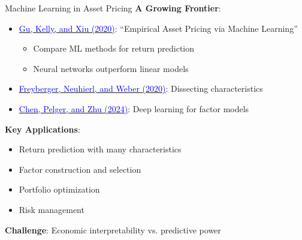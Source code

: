 \documentclass{beamer}
\begin{document}
\begin{frame}{Machine Learning in Asset Pricing}
	\textbf{A Growing Frontier}:
	\begin{itemize}
		\item \href{https://doi.org/10.1093/rfs/hhaa009}{\textcolor{blue}{Gu, Kelly, and Xiu (2020)}}: ``Empirical Asset Pricing via Machine Learning''
		\begin{itemize}
			\item Compare ML methods for return prediction
			\item Neural networks outperform linear models
		\end{itemize}
		\item \href{https://doi.org/10.1093/rfs/hhz123}{\textcolor{blue}{Freyberger, Neuhierl, and Weber (2020)}}: Dissecting characteristics
		\item \href{https://doi.org/10.1287/mnsc.2023.4695}{\textcolor{blue}{Chen, Pelger, and Zhu (2024)}}: Deep learning for factor models
	\end{itemize}
	
	\vspace{10pt}
	\textbf{Key Applications}:
	\begin{itemize}
		\item Return prediction with many characteristics
		\item Factor construction and selection
		\item Portfolio optimization
		\item Risk management
	\end{itemize}
	
	\vspace{5pt}
	\textbf{Challenge}: Economic interpretability vs. predictive power
\end{frame}


\end{document}
